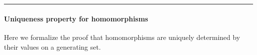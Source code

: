 \begin{code}
\AgdaSymbol{=}%
\>[149I]\AgdaSymbol{(}\AgdaSpace{}%
\AgdaSpace{}%
\AgdaSymbol{)}\AgdaSpace{}%
%
\>[25]\AgdaSpace{}%
\AgdaSpace{}%
\AgdaSymbol{(}\AgdaSpace{}%
\AgdaSpace{}%
\AgdaSymbol{)(}\AgdaSpace{}%
\AgdaSymbol{)}\AgdaSpace{}%
\<%
\\
\>[.][@{}l@{}]\<[149I]%
\>[6]\AgdaSymbol{(}\AgdaSpace{}%
\AgdaSpace{}%
\AgdaSymbol{)(}\AgdaSpace{}%
\AgdaSpace{}%
\AgdaSpace{}%
\AgdaSpace{}%
\AgdaSymbol{)}%
\>[27]\AgdaSymbol{(}\AgdaSpace{}%
\AgdaSpace{}%
\AgdaSpace{}%
\AgdaSpace{}%
\AgdaSymbol{)}\AgdaSpace{}%
\<%
\\
%
\>[6]\AgdaSpace{}%
\AgdaSpace{}%
\AgdaSymbol{((}\AgdaSpace{}%
\AgdaSpace{}%
\AgdaSymbol{)}\AgdaSpace{}%
\AgdaSymbol{)}%
\>[26]\<%
\end{code}

\begin{center}\rule{0.5\linewidth}{\linethickness}\end{center}

\paragraph{Uniqueness property for
homomorphisms}\label{uniqueness-property-for-homomorphisms}

Here we formalize the proof that homomorphisms are uniquely determined
by their values on a generating set.

